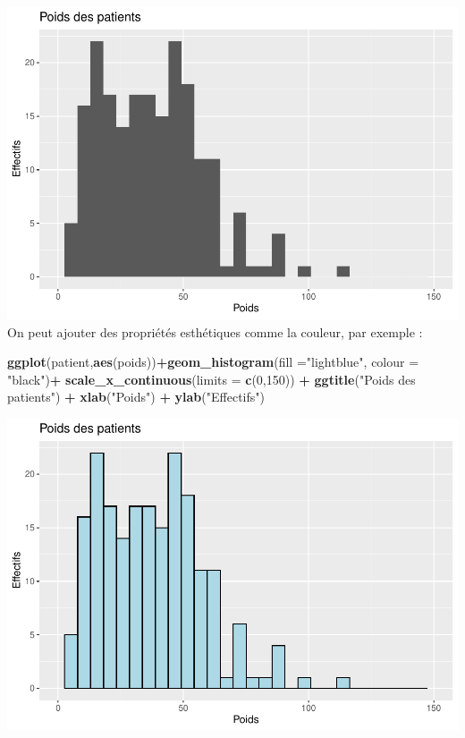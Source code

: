 \documentclass[
]{book}
\newenvironment{Shaded}{\begin{snugshade}}{\end{snugshade}}
\newcommand{\AttributeTok}[1]{\textcolor[rgb]{0.13,0.29,0.53}{#1}}
\newcommand{\DecValTok}[1]{\textcolor[rgb]{0.00,0.00,0.81}{#1}}
\newcommand{\FunctionTok}[1]{\textcolor[rgb]{0.13,0.29,0.53}{\textbf{#1}}}
\newcommand{\NormalTok}[1]{#1}
\newcommand{\SpecialCharTok}[1]{\textcolor[rgb]{0.81,0.36,0.00}{\textbf{#1}}}
\newcommand{\StringTok}[1]{\textcolor[rgb]{0.31,0.60,0.02}{#1}}
\begin{document}
\includegraphics{_main_files/figure-latex/ggplot6-1.pdf}
On peut ajouter des propriétés esthétiques comme la couleur, par exemple :

\begin{Shaded}
\begin{Highlighting}[]
\FunctionTok{ggplot}\NormalTok{(patient,}\FunctionTok{aes}\NormalTok{(poids))}\SpecialCharTok{+}\FunctionTok{geom\_histogram}\NormalTok{(}\AttributeTok{fill =}\StringTok{"lightblue"}\NormalTok{, }\AttributeTok{colour =} \StringTok{"black"}\NormalTok{)}\SpecialCharTok{+}
  \FunctionTok{scale\_x\_continuous}\NormalTok{(}\AttributeTok{limits =} \FunctionTok{c}\NormalTok{(}\DecValTok{0}\NormalTok{,}\DecValTok{150}\NormalTok{)) }\SpecialCharTok{+} 
  \FunctionTok{ggtitle}\NormalTok{(}\StringTok{"Poids des patients"}\NormalTok{) }\SpecialCharTok{+} 
  \FunctionTok{xlab}\NormalTok{(}\StringTok{"Poids"}\NormalTok{) }\SpecialCharTok{+} 
  \FunctionTok{ylab}\NormalTok{(}\StringTok{"Effectifs"}\NormalTok{)}
\end{Highlighting}
\end{Shaded}

\includegraphics{_main_files/figure-latex/ggplot7-1.pdf}
\end{document}
